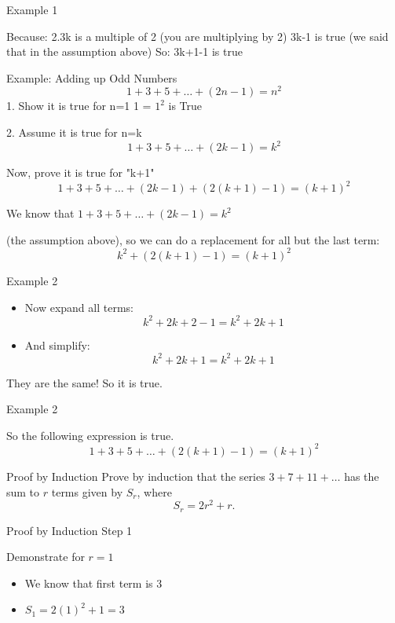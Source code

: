 
{Example 1}

Because:
2.3k is a multiple of 2 (you are multiplying by 2)
3k-1 is true (we said that in the assumption above)
So:
3k+1-1 is true


Example: Adding up Odd Numbers
\[1 + 3 + 5 + \ldots + (2n-1) = n^2\]
1. Show it is true for n=1
1 = $1^2$ is True
 
2. Assume it is true for n=k
\[1 + 3 + 5 + \ldots + (2k-1) = k^2\]



 
Now, prove it is true for "k+1"
\[ 1 + 3 + 5 + \ldots + (2k-1) + (2(k+1)-1) = (k+1)^2  \]


 
We know that $1 + 3 + 5 + \ldots + (2k-1) = k^2$ 

(the assumption above), so we can do a replacement for all but the last term:
\[k^2 + (2(k+1)-1) = (k+1)^2\]



{Example 2}

\begin{itemize}
\item Now expand all terms:
\[ k^2 + 2k + 2 - 1 = k^2 + 2k+1 \]
\item And simplify:
\[ k^2 + 2k + 1 = k^2 + 2k + 1 \]
\end{itemize}
They are the same! So it is true.



{Example 2}

So the following expression is true. 
\[ 1 + 3 + 5 + \ldots + (2(k+1)-1) = (k+1)^2 \]



{Proof by Induction}
Prove by induction that the series $3 + 7 + 11 + \ldots$ has the sum to $r$
terms given by $S_r$, where
\[S_r = 2r^2 + r.\]



{Proof by Induction}
Step 1

Demonstrate for $r=1$
\begin{itemize}
\item We know that first term is 3 
\item $S_1  = 2(1)^2 + 1 = 3$
\end{itemize}



